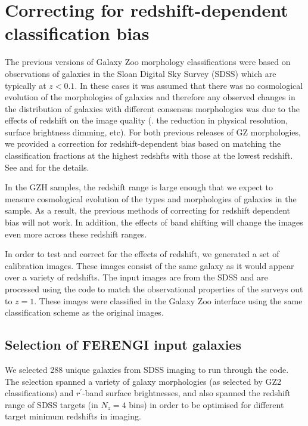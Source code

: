 \documentclass[twocolumn]{aastex6}
\begin{document}
\section{Correcting for redshift-dependent classification bias}\label{sec:debiasing}

The previous versions of Galaxy Zoo morphology classifications \citep{lin08,wil13} were based on observations of galaxies in the Sloan Digital Sky Survey (SDSS) which are typically at $z<0.1$. In these cases it was assumed that there was no cosmological evolution of the morphologies of galaxies and therefore any observed changes in the distribution of galaxies with different consensus morphologies was due to the effects of redshift on the image quality (\ie. the reduction in physical resolution, surface brightness dimming, etc). For both previous releases of GZ morphologies, we provided a correction for redshift-dependent bias based on matching the classification fractions at the highest redshfts with those at the lowest redshift. See \citet{bam09} and \citet{wil13} for the details. 

In the GZH samples, the redshift range is large enough that we expect to measure cosmological evolution of the types and morphologies of galaxies in the sample. As a result, the previous methods of correcting for redshift dependent bias will not work. In addition, the effects of band shifting will change the images even more across these redshift ranges. %

In order to test and correct for the effects of redshift, we generated a set of calibration images. These images consist of the same galaxy as it would appear over a variety of redshifts. The input images are from the SDSS \citep{yor00,str02} and are processed using the \ferengi{} code \citep{bar08a} to match the observational properties of the \hst{} surveys out to $z=1$. These images were classified in the Galaxy Zoo interface using the same classification scheme as the original \hst{} images.
 
\subsection{Selection of FERENGI input galaxies}

We selected 288 unique galaxies from SDSS imaging to run through the \ferengi{} code. The selection spanned a variety of galaxy morphologies (as selected by GZ2 classifications) and $r^\prime$-band surface brightnesses, and also spanned the redshift range of SDSS targets (in $N_z = 4$ bins) in order to be optimised for different target minimum redshifts in \hst{} imaging. 
\end{document}
